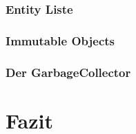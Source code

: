		\subsubsection{Entity Liste}				\clearpage
		\subsubsection{Immutable Objects}			\clearpage
		\subsubsection{Der GarbageCollector}		\clearpage
\section{Fazit}                                     \clearpage
